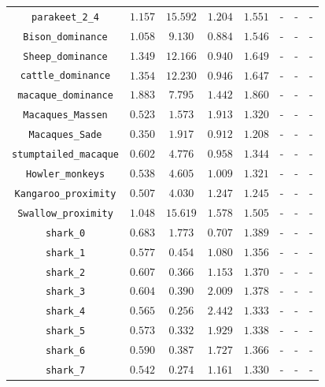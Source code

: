 \documentclass[twocolumn,8pt]{article}
\begin{document}
\begin{table}[p]
\begin{tabular}{c|ccccccc}
\verb|parakeet_2_4| & $1.157$ & $15.592$ & $1.204$ & $1.551$ & - & - & - \\
\verb|Bison_dominance| & $1.058$ & $9.130$ & $0.884$ & $1.546$ & - & - & - \\
\verb|Sheep_dominance| & $1.349$ & $12.166$ & $0.940$ & $1.649$ & - & - & - \\
\verb|cattle_dominance| & $1.354$ & $12.230$ & $0.946$ & $1.647$ & - & - & - \\
\verb|macaque_dominance| & $1.883$ & $7.795$ & $1.442$ & $1.860$ & - & - & - \\
\verb|Macaques_Massen| & $0.523$ & $1.573$ & $1.913$ & $1.320$ & - & - & - \\
\verb|Macaques_Sade| & $0.350$ & $1.917$ & $0.912$ & $1.208$ & - & - & - \\
\verb|stumptailed_macaque| & $0.602$ & $4.776$ & $0.958$ & $1.344$ & - & - & - \\
\verb|Howler_monkeys| & $0.538$ & $4.605$ & $1.009$ & $1.321$ & - & - & - \\
\verb|Kangaroo_proximity| & $0.507$ & $4.030$ & $1.247$ & $1.245$ & - & - & - \\
\verb|Swallow_proximity| & $1.048$ & $15.619$ & $1.578$ & $1.505$ & - & - & - \\
\verb|shark_0| & $0.683$ & $1.773$ & $0.707$ & $1.389$ & - & - & - \\
\verb|shark_1| & $0.577$ & $0.454$ & $1.080$ & $1.356$ & - & - & - \\
\verb|shark_2| & $0.607$ & $0.366$ & $1.153$ & $1.370$ & - & - & - \\
\verb|shark_3| & $0.604$ & $0.390$ & $2.009$ & $1.378$ & - & - & - \\
\verb|shark_4| & $0.565$ & $0.256$ & $2.442$ & $1.333$ & - & - & - \\
\verb|shark_5| & $0.573$ & $0.332$ & $1.929$ & $1.338$ & - & - & - \\
\verb|shark_6| & $0.590$ & $0.387$ & $1.727$ & $1.366$ & - & - & - \\
\verb|shark_7| & $0.542$ & $0.274$ & $1.161$ & $1.330$ & - & - & - \\
\bottomrule 
\end{tabular} 
\end{table}


\end{document}
